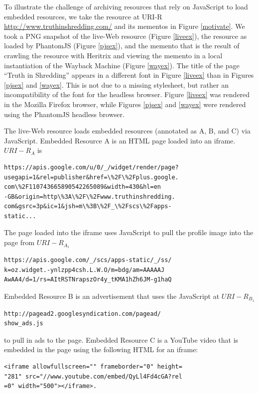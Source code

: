 \documentclass{sig-alternate}
\begin{document}
To illustrate the challenge of archiving resources that rely on JavaScript to load embedded resources, we take the resource at URI-R \url{http://www.truthinshredding.com/} and its mementos in Figure \ref{motivate}. We took a PNG snapshot of the live-Web resource (Figure \ref{liveex}), the resource as loaded by PhantomJS (Figure \ref{pjsex}), and the memento that is the result of crawling the resource with Heritrix and viewing the memento in a local instantiation of the Wayback Machine (Figure \ref{wayex}). The title of the page ``Truth in Shredding'' appears in a different font in Figure \ref{liveex} than in Figures \ref{pjsex} and \ref{wayex}. This is not due to a missing stylesheet, but rather an incompatibility of the font for the headless browser. Figure \ref{liveex} was rendered in the Mozilla Firefox browser, while Figures \ref{pjsex} and \ref{wayex} were rendered using the PhantomJS headless browser.

The live-Web resource loads embedded resources (annotated as A, B, and C) via JavaScript. Embedded Resource A is an HTML page loaded into an iframe. $URI-R_A$ is
\vskip -3mm
\begin{verbatim}
https://apis.google.com/u/0/_/widget/render/page?
usegapi=1&rel=publisher&href=\%2F\%2Fplus.google.
com\%2F110743665890542265089&width=430&hl=en
-GB&origin=http\%3A\%2F\%2Fwww.truthinshredding.
com&gsrc=3p&ic=1&jsh=m\%3B\%2F_\%2Fscs\%2Fapps-
static...
\end{verbatim}
\vskip -3mm
The page loaded into the iframe uses JavaScript to pull the profile image into the page from $URI-R_{A_1}$ 
\vskip -3mm
\begin{verbatim}
https://apis.google.com/_/scs/apps-static/_/ss/
k=oz.widget.-ynlzpp4csh.L.W.O/m=bdg/am=AAAAAJ
AwAA4/d=1/rs=AItRSTNrapszOr4y_tKMA1hZh6JM-g1haQ
\end{verbatim}
\vskip -3mm
Embedded Resource B is an advertisement that uses the JavaScript at $URI-R_{B_1}$ 
\vskip -3mm
\begin{verbatim}
http://pagead2.googlesyndication.com/pagead/
show_ads.js
\end{verbatim}
\vskip -3mm
to pull in ads to the page. Embedded Resource C is a YouTube video that is embedded in the page using the following HTML for an iframe:
\vskip -3mm
 
\begin{verbatim}
<iframe allowfullscreen="" frameborder="0" height=
"281" src="//www.youtube.com/embed/QyLl4Fd4cGA?rel
=0" width="500"></iframe>.
\end{verbatim}
\vskip -3mm
\end{document}
